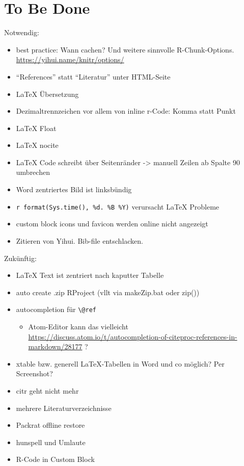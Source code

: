 \documentclass[]{book}
\providecommand{\tightlist}{%
  \setlength{\itemsep}{0pt}\setlength{\parskip}{0pt}}
\theoremstyle{definition}
\theoremstyle{definition}
\theoremstyle{remark}
\begin{document}
\hypertarget{tbd}{\chapter{To Be Done}\label{tbd}}

Notwendig:

\begin{itemize}
\tightlist
\item
  best practice: Wann cachen? Und weitere sinnvolle R-Chunk-Options.
  \url{https://yihui.name/knitr/options/}
\item
  ``References'' statt ``Literatur'' unter HTML-Seite
\item
  LaTeX Übersetzung
\item
  Dezimaltrennzeichen vor allem von inline r-Code: Komma statt Punkt
\item
  LaTeX Float
\item
  LaTeX nocite
\item
  LaTeX Code schreibt über Seitenränder -\textgreater{} manuell Zeilen
  ab Spalte 90 umbrechen
\item
  Word zentriertes Bild ist linksbündig
\item
  \texttt{\textquotesingle{}r\ format(Sys.time(),\ \textquotesingle{}\%d.\ \%B\ \%Y\textquotesingle{})\textquotesingle{}}
  verursacht LaTeX Probleme
\item
  custom block icons und favicon werden online nicht angezeigt
\item
  Zitieren von Yihui. Bib-file entschlacken.
\end{itemize}

Zukünftig:

\begin{itemize}
\tightlist
\item
  LaTeX Text ist zentriert nach kaputter Tabelle
\item
  auto create .zip RProject (vllt via makeZip.bat oder zip())
\item
  autocompletion für \texttt{\textbackslash{}@ref}

  \begin{itemize}
  \tightlist
  \item
    Atom-Editor kann das vielleicht
    \url{https://discuss.atom.io/t/autocompletion-of-citeproc-references-in-markdown/28177}
    ?
  \end{itemize}
\item
  xtable bzw. generell LaTeX-Tabellen in Word und co möglich? Per
  Screenshot?
\item
  citr geht nicht mehr
\item
  mehrere Literaturverzeichnisse
\item
  Packrat offline restore
\item
  hunspell und Umlaute
\item
  R-Code in Custom Block
\end{itemize}
\end{document}
